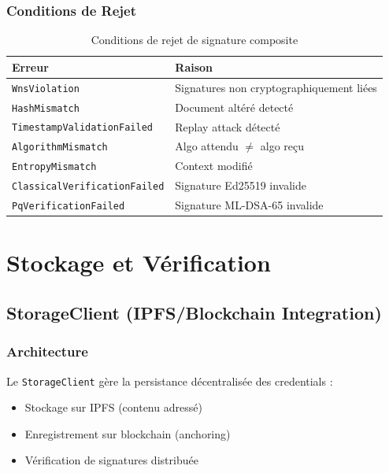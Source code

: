 \documentclass[12pt,a4paper]{report}
\begin{document}
\subsection{Conditions de Rejet}

\begin{table}[H]
\centering
\begin{tabular}{|l|l|}
\hline
\textbf{Erreur} & \textbf{Raison} \\
\hline
\texttt{WnsViolation} & Signatures non cryptographiquement liées \\
\hline
\texttt{HashMismatch} & Document altéré detecté \\
\hline
\texttt{TimestampValidationFailed} & Replay attack détecté \\
\hline
\texttt{AlgorithmMismatch} & Algo attendu $\neq$ algo reçu \\
\hline
\texttt{EntropyMismatch} & Context modifié \\
\hline
\texttt{ClassicalVerificationFailed} & Signature Ed25519 invalide \\
\hline
\texttt{PqVerificationFailed} & Signature ML-DSA-65 invalide \\
\hline
\end{tabular}
\caption{Conditions de rejet de signature composite}
\end{table}

\chapter{Stockage et Vérification}

\section{StorageClient (IPFS/Blockchain Integration)}

\subsection{Architecture}

Le \texttt{StorageClient} gère la persistance décentralisée des credentials :
\begin{itemize}
  \item Stockage sur IPFS (contenu adressé)
  \item Enregistrement sur blockchain (anchoring)
  \item Vérification de signatures distribuée
\end{itemize}
\end{document}
